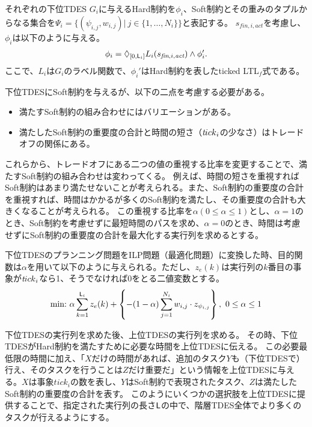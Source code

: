 \documentclass[ 10pt]{jsarticle}
\newcommand{\ttick}{{\textit tick}}
\newcommand{\Len}{{\sf L}}
\begin{document}
それぞれの下位TDES $G_i$に与えるHard制約を$\phi_i$、Soft制約とその重みのタプルからなる集合を$\Psi_i=\{(\psi_{i,j},w_{i,j})|~j\in\{1,\ldots,N_i\}\}$と表記する。
$s_{\textit{fin},i,\textit{act}}$を考慮し、$\phi_i$は以下のように与える。
\begin{align}
\phi_i=\Diamond_{[0,\Len_i]}L_i(s_{\textit{fin},i,\textit{act}}) \land \phi_i'.
\end{align}
ここで、$L_i$は$G_i$のラベル関数で、$\phi_i'$はHard制約を表したticked LTL${}_f$式である。


下位TDESにSoft制約を与えるが、以下の二点を考慮する必要がある。
\begin{itemize}
\item
満たすSoft制約の組み合わせにはバリエーションがある。
\item
満たしたSoft制約の重要度の合計と時間の短さ（$\ttick_i$の少なさ）はトレードオフの関係にある。
\end{itemize}
これらから、トレードオフにある二つの値の重視する比率を変更することで、満たすSoft制約の組み合わせは変わってくる。
例えば、時間の短さを重視すればSoft制約はあまり満たせないことが考えられる。また、Soft制約の重要度の合計を重視すれば、時間はかかるが多くのSoft制約を満たし、その重要度の合計も大きくなることが考えられる。
この重視する比率を$\alpha(0\leq\alpha\leq1)$とし、$\alpha=1$のとき、Soft制約を考慮せずに最短時間のパスを求め、$\alpha=0$のとき、時間は考慮せずにSoft制約の重要度の合計を最大化する実行列を求めるとする。

下位TDESのプランニング問題をILP問題（最適化問題）に変換した時、目的関数は$\alpha$を用いて以下のように与えられる。ただし、$z_e(k)$は実行列の$k$番目の事象が$\ttick_i$なら1、そうでなければ0をとる二値変数とする。
\begin{align}\label{obj:alpha}
\mbox{min:}~\alpha\sum_{k=1}^{\Len_i}z_e(k) + \left\{-(1-\alpha)\sum_{j=1}^{N_i} w_{i,j}\cdot z_{\psi_{i,j}}\right\},~0\leq \alpha\leq 1
\end{align}
%

下位TDESの実行列を求めた後、上位TDESの実行列を求める。
その時、下位TDESがHard制約を満たすために必要な時間を上位TDESに伝える。
この必要最低限の時間に加え、「$X$だけの時間があれば、追加のタスク$Y$も（下位TDESで）行え、そのタスクを行うことは$Z$だけ重要だ」という情報を上位TDESに与える。$X$は事象$\textit{tick}_i$の数を表し、$Y$はSoft制約で表現されたタスク、$Z$は満たしたSoft制約の重要度の合計を表す。
このようにいくつかの選択肢を上位TDESに提供することで、指定された実行列の長さ$\Len$の中で、階層TDES全体でより多くのタスクが行えるようにする。
\end{document}
